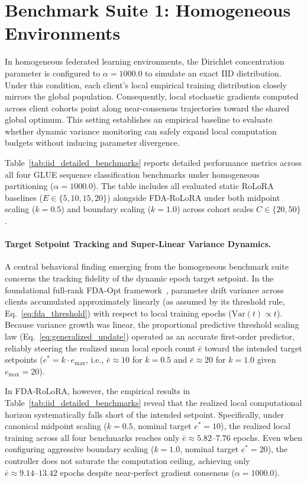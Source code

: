 \section{Benchmark Suite 1: Homogeneous Environments}
\label{sec:eval_iid}

In homogeneous federated learning environments, the Dirichlet concentration parameter is configured to $\alpha = 1000.0$ to simulate an exact IID distribution. Under this condition, each client's local empirical training distribution closely mirrors the global population. Consequently, local stochastic gradients computed across client cohorts point along near-consensus trajectories toward the shared global optimum. This setting establishes an empirical baseline to evaluate whether dynamic variance monitoring can safely expand local computation budgets without inducing parameter divergence.

Table~\ref{tab:iid_detailed_benchmarks} reports detailed performance metrics across all four GLUE sequence classification benchmarks under homogeneous partitioning ($\alpha=1000.0$). The table includes all evaluated static RoLoRA baselines ($E \in \{5, 10, 15, 20\}$) alongside FDA-RoLoRA under both midpoint scaling ($k=0.5$) and boundary scaling ($k=1.0$) across cohort scales $C \in \{20, 50\}$.



\paragraph{Target Setpoint Tracking and Super-Linear Variance Dynamics.}
A central behavioral finding emerging from the homogeneous benchmark suite concerns the tracking fidelity of the dynamic epoch target setpoint. In the foundational full-rank FDA-Opt framework~\cite{theologitis2025fda}, parameter drift variance across clients accumulated approximately linearly (as assumed by its threshold rule, Eq.~\ref{eq:fda_threshold}) with respect to local training epochs ($\text{Var}(t) \propto t$). Because variance growth was linear, the proportional predictive threshold scaling law (Eq.~\ref{eq:generalized_update}) operated as an accurate first-order predictor, reliably steering the realized mean local epoch count $\bar{e}$ toward the intended target setpoints ($e^* = k \cdot e_{\max}$, i.e., $\bar{e} \approx 10$ for $k=0.5$ and $\bar{e} \approx 20$ for $k=1.0$ given $e_{\max}=20$).

In FDA-RoLoRA, however, the empirical results in Table~\ref{tab:iid_detailed_benchmarks} reveal that the realized local computational horizon systematically falls short of the intended setpoint. Specifically, under canonical midpoint scaling ($k=0.5$, nominal target $e^* = 10$), the realized local training across all four benchmarks reaches only $\bar{e} \approx 5.82\text{--}7.76$ epochs. Even when configuring aggressive boundary scaling ($k=1.0$, nominal target $e^* = 20$), the controller does not saturate the computation ceiling, achieving only $\bar{e} \approx 9.14\text{--}13.42$ epochs despite near-perfect gradient consensus ($\alpha=1000.0$).


